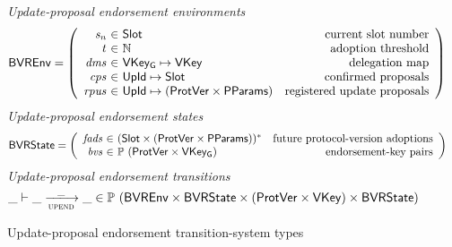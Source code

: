 \begin{figure}[htb]
  \emph{Update-proposal endorsement environments}
  \begin{align*}
    & \BVREnv
      = \left(
      \begin{array}{r@{~\in~}lr}
        \var{s_n} & \Slot & \text{current slot number}\\
        t & \mathbb{N} & \text{adoption threshold}\\
        \var{dms} & \VKeyGen \mapsto \VKey & \text{delegation map}\\
        \var{cps} & \UPropId \mapsto \Slot & \text{confirmed proposals}\\
        \var{rpus} & \UPropId \mapsto (\ProtVer \times \PPMMap)
                             & \text{registered update proposals}\\
      \end{array}\right)
  \end{align*}
  \emph{Update-proposal endorsement states}
  \begin{align*}
    & \BVRState
      = \left(
      \begin{array}{r@{~\in~}lr}
        \var{fads} & \seqof{(\Slot \times (\ProtVer \times \PPMMap))}
        & \text{future protocol-version adoptions}\\
        \var{bvs} & \powerset{(\ProtVer \times \VKeyGen)}
        & \text{endorsement-key pairs}
      \end{array}\right)
  \end{align*}
  \emph{Update-proposal endorsement transitions}
    \begin{equation*}
    \_ \vdash \_ \trans{upend}{\_} \_ \in
    \powerset (\BVREnv \times \BVRState
    \times (\ProtVer \times \VKey) \times \BVRState)
    \end{equation*}
  \caption{Update-proposal endorsement transition-system types}
  \label{fig:ts-types:up-end}
\end{figure}

